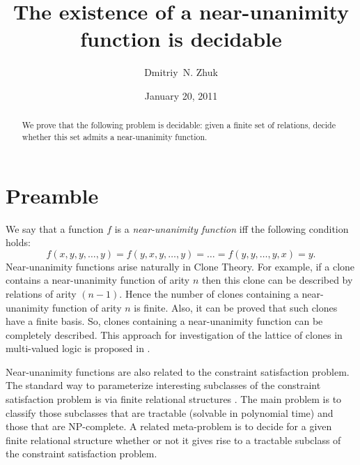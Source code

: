 \documentclass{au}
\theoremstyle{plain}
\theoremstyle{definition}
\theoremstyle{remark}
\numberwithin{equation}{section}
\begin{document}
\title[The existence of a near-unanimity function is decidable]
{The existence of a near-unanimity function is decidable}
\author{Dmitriy~N. Zhuk}
\address{Department of Mathematics and Mechanics\\
Moscow State University\\
Moscow, Russia 119192}
\date{January 20, 2011}

\begin{abstract}

We prove that the following problem is decidable: given a finite set of relations, decide
whether this set admits a near-unanimity function.

\end{abstract}

\maketitle

\section{Preamble}

We say that a function $f$ is a \emph{near-unanimity function}
iff the following condition holds:
$$f(x,y,y,\ldots,y) =
f(y,x,y,\ldots,y) = \ldots = f(y,y,\ldots,y, x) = y.
$$
Near-unanimity functions arise naturally in Clone Theory. 
For example, if a clone contains a near-unanimity function of arity $n$ then
this clone can be described by relations of arity $(n-1)$\cite{pixley,jeavons}.
Hence the number of clones containing a near-unanimity function of arity $n$ is finite.
Also, it can be proved that such clones have a finite basis.
So, clones containing a near-unanimity function can be completely described.
This approach for investigation of the lattice of clones in multi-valued logic is proposed in \cite{lau}.

Near-unanimity functions are also related to the constraint satisfaction problem.
The standard way to parameterize interesting subclasses of the constraint satisfaction
problem is via finite relational structures \cite{FederVardi}. The main
problem is to classify those subclasses that are tractable (solvable in polynomial
time) and those that are NP-complete. A related meta-problem is to decide for
a given finite relational structure whether or not it gives rise to a tractable
subclass of the constraint satisfaction problem.
\end{document}
